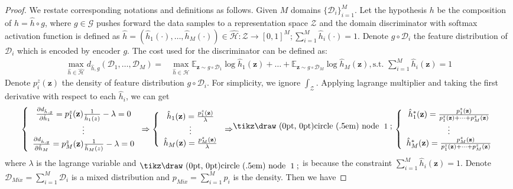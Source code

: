 \documentclass{article} \usepackage{iclr2023_conference,times}
\newcommand{\E}{\mathbb{E}}
\newcommand{\z}{\mathbf{z}}
\newcommand{\D}{\mathcal{D}}
\newcommand*{\circled}[1]{\lower.7ex\hbox{\tikz\draw (0pt, 0pt)circle (.5em) node {\makebox[1em][c]{\small #1}};}}
\begin{document}
\begin{proof}
We restate corresponding notations and definitions as follows. Given $M$ domains $\{\D_i\}_{i=1}^M$. Let the hypothesis $h$ be the composition of $h=\hat{h}\circ g$, where $g\in\mathcal{G}$ pushes forward the data samples to a representation space $\mathcal{Z}$ and the domain discriminator with softmax activation function is defined as $\hat{h}=(\hat{h}_1(\cdot),\dots,\hat{h}_M(\cdot))\in\hat{\mathcal{H}}:\mathcal{Z}\rightarrow[0,1]^M;\sum_{i=1}^M\hat{h}_i(\cdot)=1$. Denote $g\circ\D_i$ the feature distribution of $\D_i$ which is encoded by encoder $g$. The cost used for the discriminator can be defined as:
\begin{equation}
\begin{aligned}
    \max_{\hat{h}\in\hat{\mathcal{H}}} d_{\hat{h}, g}(\D_1,\dots,\D_M)=&\max_{\hat{h}\in{\mathcal{H}}} \E_{\z\sim g\circ  \D_1}\log \hat{h}_1(\z)+\dots+\E_{\z\sim g\circ \D_M} \log\hat{h}_M(\z),\text{s.t. }\sum_{i=1}^M\hat{h}_i(\z)=1
\end{aligned}
\end{equation}
Denote $p_i^z(\z)$ the density of feature distribution $g\circ\D_i$. For simplicity, we ignore $\int_{\mathcal{Z}}$. Applying lagrange multiplier and taking the first derivative with respect to each $\hat{h}_i$, we can get
\begin{equation}
\left\{         \begin{array}{c} 
    \frac{\partial d_{\hat{h},g}}{\partial \hat{h}_1}=p_1^z(\z)\frac{1}{\hat{h}_1(z)}-\lambda=0\\ 
    \vdots\\ 
    \frac{\partial d_{\hat{h},g}}{\partial \hat{h}_M}=p_M^z(\z)\frac{1}{\hat{h}_M(z)}-\lambda=0\\ 
  \end{array}\right.
  \Rightarrow
\left\{         \begin{array}{c} 
    \hat{h}_1(\z)=\frac{p_1^z(\z)}{\lambda}\\ 
    \vdots\\ 
    \hat{h}_M(\z)=\frac{p_M^z(\z)}{\lambda}\\ 
  \end{array}\right.
   \Rightarrow^{\rm \circled{\rm 1}}
\left\{         \begin{array}{c} 
    \hat{h}_1^*(\z)=\frac{p_1^z(\z)}{p_1^z(\z)+\dots+p_M^z(\z)}\\ 
    \vdots\\ 
    \hat{h}_M^*(\z)=\frac{p_M^z(\z)}{p_1^z(\z)+\dots+p_M^z(\z)}\\ 
  \end{array}\right.
  \label{equ:opt_multidomain}
\end{equation}
where $\lambda$ is the lagrange variable and $\rm \circled{\rm 1}$ is because the constraint $\sum_{i=1}^M\hat{h}_i(\z)=1$. Denote $\D_{Mix}=\sum_{i=1}^M \D_i$ is a mixed distribution and $p_{Mix}=\sum_{i=1}^M p_i$ is the density. Then we have


\end{proof}
\end{document}
